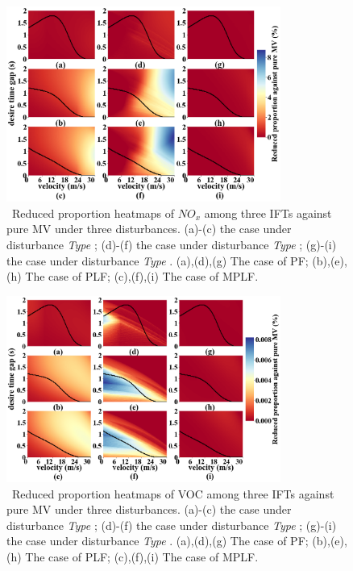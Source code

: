 \documentclass[journal]{IEEEtran}
\begin{document}
\begin{figure}
  \includegraphics[width=9cm]{fig5.4_2.png}
  \caption{~Reduced proportion heatmaps of $NO_x$ among three IFTs against pure MV under three disturbances. (a)-(c) the case under disturbance \textit{Type \uppercase\expandafter{}}; (d)-(f) the case under disturbance \textit{Type \uppercase\expandafter{}}; (g)-(i) the case under disturbance \textit{Type \uppercase\expandafter{}}. (a),(d),(g) The case of PF; (b),(e),(h) The case of PLF; (c),(f),(i) The case of MPLF.}
  \label{fig5.4_2}
\end{figure}

\begin{figure}
  \includegraphics[width=9cm]{fig5.4_3.png}
  \caption{~Reduced proportion heatmaps of VOC among three IFTs against pure MV under three disturbances. (a)-(c) the case under disturbance \textit{Type \uppercase\expandafter{}}; (d)-(f) the case under disturbance \textit{Type \uppercase\expandafter{}}; (g)-(i) the case under disturbance \textit{Type \uppercase\expandafter{}}. (a),(d),(g) The case of PF; (b),(e),(h) The case of PLF; (c),(f),(i) The case of MPLF.}
  \label{fig5.4_3}
\end{figure}
\end{document}

